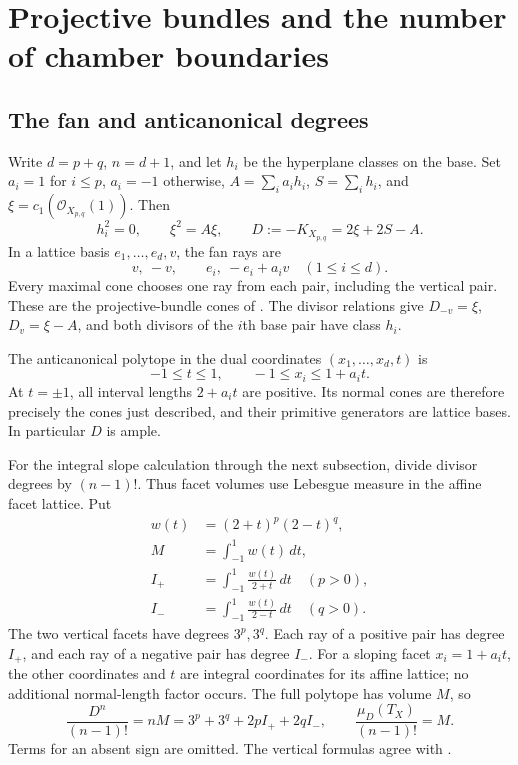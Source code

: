 \documentclass[11pt]{amsart}
\theoremstyle{definition}
\theoremstyle{remark}
\begin{document}
\section{Projective bundles and the number of chamber boundaries}
\label{sec:family}

\subsection{The fan and anticanonical degrees}
Write $d=p+q$, $n=d+1$, and let $h_i$ be the hyperplane classes on the
base. Set $a_i=1$ for $i\le p$, $a_i=-1$ otherwise,
$A=\sum_i a_i h_i$, $S=\sum_i h_i$, and
$\xi=c_1(\mathcal O_{X_{p,q}}(1))$. Then
\begin{equation}\label{eq:chow}
 h_i^2=0,\qquad \xi^2=A\xi,\qquad
 D:=-K_{X_{p,q}}=2\xi+2S-A.
\end{equation}
In a lattice basis $e_1,\ldots,e_d,v$, the fan rays are
\begin{equation}\label{eq:family-rays}
 v,\ -v,\qquad e_i,\ -e_i+a_iv\quad(1\le i\le d).
\end{equation}
Every maximal cone chooses one ray from each pair, including the vertical
pair. These are the projective-bundle cones of \cite[Section~7.3]{CLS}.
The divisor relations give $D_{-v}=\xi$, $D_v=\xi-A$, and both divisors
of the $i$th base pair have class $h_i$.

The anticanonical polytope in the dual coordinates $(x_1,\ldots,x_d,t)$
is
\begin{equation}\label{eq:family-polytope}
 -1\le t\le1,\qquad -1\le x_i\le1+a_it.
\end{equation}
At $t=\pm1$, all interval lengths $2+a_it$ are positive. Its normal
cones are therefore precisely the cones just described, and their
primitive generators are lattice bases. In particular $D$ is ample.

For the integral slope calculation through the next subsection, divide
divisor degrees by $(n-1)!$.
Thus facet volumes use Lebesgue measure in the affine facet lattice.
Put
\begin{equation}\label{eq:general-integrals}
 \begin{split}
 w(t)&=(2+t)^p(2-t)^q,\\
 M&=\int_{-1}^1w(t)\,dt,\\
 I_+&=\int_{-1}^1\frac{w(t)}{2+t}\,dt\quad(p>0),\\
 I_-&=\int_{-1}^1\frac{w(t)}{2-t}\,dt\quad(q>0).
 \end{split}
\end{equation}
The two vertical facets have degrees $3^p,3^q$. Each ray of a positive
pair has degree $I_+$, and each ray of a negative pair has degree $I_-$.
For a sloping facet $x_i=1+a_it$, the other coordinates and $t$ are
integral coordinates for its affine lattice; no additional normal-length
factor occurs. The full polytope has volume $M$, so
\begin{equation}\label{eq:total-slope}
 \frac{D^n}{(n-1)!}=nM=3^p+3^q+2pI_++2qI_-,
 \qquad \frac{\mu_D(T_X)}{(n-1)!}=M.
\end{equation}
Terms for an absent sign are omitted. The vertical formulas agree with
\cite[Lemmas~4.2.3--4.2.4]{Reynolds}.
\end{document}
